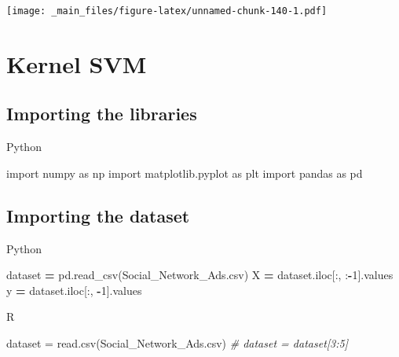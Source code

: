 \documentclass[
]{book}
\newenvironment{Shaded}{\begin{snugshade}}{\end{snugshade}}
\newcommand{\CommentTok}[1]{\textcolor[rgb]{0.56,0.35,0.01}{\textit{#1}}}
\newcommand{\DecValTok}[1]{\textcolor[rgb]{0.00,0.00,0.81}{#1}}
\newcommand{\FunctionTok}[1]{\textcolor[rgb]{0.00,0.00,0.00}{#1}}
\newcommand{\ImportTok}[1]{#1}
\newcommand{\NormalTok}[1]{#1}
\newcommand{\OperatorTok}[1]{\textcolor[rgb]{0.81,0.36,0.00}{\textbf{#1}}}
\newcommand{\OtherTok}[1]{\textcolor[rgb]{0.56,0.35,0.01}{#1}}
\newcommand{\StringTok}[1]{\textcolor[rgb]{0.31,0.60,0.02}{#1}}
\theoremstyle{definition}
\theoremstyle{definition}
\theoremstyle{definition}
\theoremstyle{definition}
\theoremstyle{remark}
\begin{document}
\texttt{[image: \_main\_files/figure-latex/unnamed-chunk-140-1.pdf]}

\hypertarget{kernel-svm}{%
\section{Kernel SVM}\label{kernel-svm}}

\hypertarget{importing-the-libraries-10}{%
\subsection{Importing the libraries}\label{importing-the-libraries-10}}

Python

\begin{Shaded}
\begin{Highlighting}[]
\ImportTok{import}\NormalTok{ numpy }\ImportTok{as}\NormalTok{ np}
\ImportTok{import}\NormalTok{ matplotlib.pyplot }\ImportTok{as}\NormalTok{ plt}
\ImportTok{import}\NormalTok{ pandas }\ImportTok{as}\NormalTok{ pd}
\end{Highlighting}
\end{Shaded}

\hypertarget{importing-the-dataset-10}{%
\subsection{Importing the dataset}\label{importing-the-dataset-10}}

Python

\begin{Shaded}
\begin{Highlighting}[]
\NormalTok{dataset }\OperatorTok{=}\NormalTok{ pd.read\_csv(}\StringTok{\textquotesingle{}Social\_Network\_Ads.csv\textquotesingle{}}\NormalTok{)}
\NormalTok{X }\OperatorTok{=}\NormalTok{ dataset.iloc[:, :}\OperatorTok{{-}}\DecValTok{1}\NormalTok{].values}
\NormalTok{y }\OperatorTok{=}\NormalTok{ dataset.iloc[:, }\OperatorTok{{-}}\DecValTok{1}\NormalTok{].values}
\end{Highlighting}
\end{Shaded}

R

\begin{Shaded}
\begin{Highlighting}[]
\NormalTok{dataset }\OtherTok{=} \FunctionTok{read.csv}\NormalTok{(}\StringTok{\textquotesingle{}Social\_Network\_Ads.csv\textquotesingle{}}\NormalTok{)}
\CommentTok{\# dataset = dataset[3:5]}
\end{Highlighting}
\end{Shaded}
\end{document}
